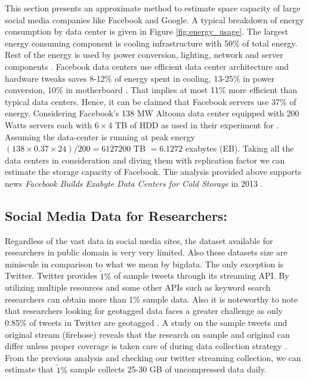 This section presents an approximate method to estimate space capacity of large social media companies like Facebook and Google.
A typical breakdown of energy consumption by data center is given in Figure \ref{fig:energy_usage}.
The largest energy consuming component is cooling infrastructure with 50\% of total energy. Rest of the energy is used by power conversion, lighting, network and server components \cite{info2007top, dayarathna2016data}. Facebook data centers use efficient data center architecture and hardware tweaks  saves
8-12\% of energy spent in cooling, 13-25\% in power conversion, 10\% in motherboard \cite{frachtenberg2011high}. That implies at most 11\%  more efficient than typical data centers. Hence, it can be claimed that Facebook servers use 37\% of energy. Considering Facebook's 138 MW Altoona data center equipped with 200 Watts servers each with $6\times4$ TB of HDD as used in their experiment for \cite{frachtenberg2011high}. Assuming the data-center is running at peak energy $(138 \times 0.37 \times 24)/ 200 = 6127200$  TB $= 6.1272$ exabytes (EB).
Taking all the data centers in consideration and diving them with replication factor we can estimate the storage capacity of Facebook. The analysis provided above supports news {\em Facebook Builds Exabyte Data Centers for Cold Storage} in 2013 \cite{facebook_support}.


\subsection*{Social Media Data for Researchers:}
Regardless of the vast data in social media sites, the dataset available for researchers in public domain is very very limited. Also these datasets size are miniscule in comparison to what we mean by bigdata. The only exception is Twitter. Twitter provides $\tilde 1\%$ of sample tweets through its streaming API. By utilizing multiple resources and some other APIs such as keyword search researchers can obtain more than 1\% sample data. Also it is noteworthy to note that researchers looking for geotagged data faces a greater challenge as only 0.85\% of tweets in Twitter are geotagged \cite{sloan2013knowing}. A study on the sample tweets and original stream (firehose) reveals that the research on sample and original can differ unless proper coverage is taken care of during data collection strategy  \cite{morstatter2013sample}. From the previous analysis and checking our twitter streaming collection, we can estimate that $\tilde 1\%$ sample collects 25-30 GB of uncompressed data daily.

